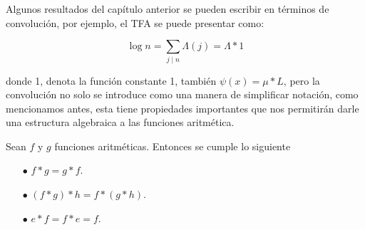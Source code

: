 Algunos resultados del capítulo anterior se pueden escribir en términos de convolución, por ejemplo, el TFA se puede presentar como:

$$\log n=\sum_{j\mid n}\Lambda(j)=\Lambda * 1$$

donde 1, denota la función constante 1, también $\psi(x)=\mu*L$, pero la convolución no solo se introduce como una manera de simplificar notación, como mencionamos antes, esta tiene propiedades importantes que nos permitirán darle una estructura algebraica a las funciones aritmética.

\begin{theorem}
Sean $f$ y $g$ funciones aritméticas. Entonces se cumple lo siguiente

\begin{itemize}

\item[$\bullet$] $f * g=g * f$.

\item[$\bullet$] $(f * g) * h=f *(g * h)$.

\item[$\bullet$] $e * f=f * e=f$.

\end{itemize}

\end{theorem}



